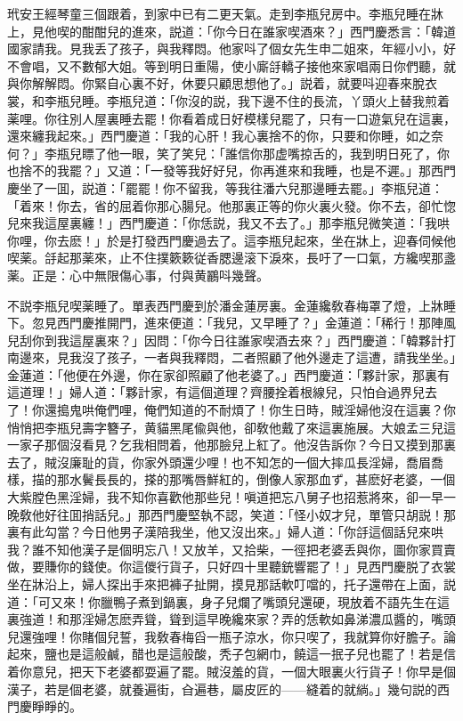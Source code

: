 玳安王經琴童三個跟着，到家中已有二更天氣。走到李瓶兒房中。李瓶兒睡在牀上，見他喫的酣酣兒的進來，説道：「你今日在誰家喫酒來？」西門慶悉言：「韓道國家請我。見我丢了孩子，與我釋悶。他家呌了個女先生申二姐來，年經小小，好不會唱，又不數郁大姐。等到明日重陽，使小廝㧱轎子接他來家唱兩日你們聽，就與你解解悶。你緊自心裏不好，休要只顧思想他了。」説着，就要呌迎春來脫衣裳，和李瓶兒睡。李瓶兒道：「你沒的説，我下邊不住的長流，丫頭火上替我煎着薬哩。你往別人屋裏睡去罷！你看着成日好模樣兒罷了，只有一口遊氣兒在這裏，還來纏我起來。」西門慶道：「我的心肝！我心裏捨不的你，只要和你睡，如之奈何？」李瓶兒瞟了他一眼，笑了笑兒：「誰信你那虚嘴掠舌的，我到明日死了，你也捨不的我罷？」又道：「一發等我好好兒，你再進來和我睡，也是不遲。」那西門慶坐了一囬，説道：「罷罷！你不留我，等我往潘六兒那邊睡去罷。」李瓶兒道：「着來！你去，省的屈着你那心腸兒。他那裏正等的你火裏火發。你不去，卻忙惚兒來我這屋裏纏！」西門慶道：「你恁説，我又不去了。」那李瓶兒微笑道：「我哄你哩，你去麽！」於是打發西門慶過去了。這李瓶兒起來，坐在牀上，迎春伺候他喫薬。㧱起那薬來，止不住撲簌簌従香腮邊滚下淚來，長吁了一口氣，方纔喫那盞薬。正是：心中無限傷心事，付與黄鸝呌幾聲。

不説李瓶兒喫薬睡了。單表西門慶到於潘金蓮房裏。金蓮纔敎春梅罩了燈，上牀睡下。忽見西門慶推開門，進來便道：「我兒，又早睡了？」金蓮道：「稀行！那陣風兒刮你到我這屋裏來？」因問：「你今日往誰家喫酒去來？」西門慶道：「韓夥計打南邊來，見我沒了孩子，一者與我釋悶，二者照顧了他外邊走了這遭，請我坐坐。」金蓮道：「他便在外邊，你在家卻照顧了他老婆了。」西門慶道：「夥計家，那裏有這道理！」婦人道：「夥計家，有這個道理？齊腰拴着根線兒，只怕㒲過界兒去了！你還搗鬼哄俺們哩，俺們知道的不耐煩了！你生日時，賊淫婦他沒在這裏？你悄悄把李瓶兒壽字簪子，黄貓黑尾偸與他，卻敎他戴了來這裏施展。大娘孟三兒這一家子那個沒看見？乞我相問着，他那臉兒上紅了。他沒告訴你？今日又摸到那裏去了，賊沒廉耻的貨，你家外頭還少哩！也不知怎的一個大摔瓜長淫婦，喬眉喬樣，描的那水鬢長長的，搽的那嘴唇鮮紅的，倒像人家那血ず，甚麽好老婆，一個大紫膛色黑淫婦，我不知你喜歡他那些兒！嗔道把忘八舅子也招惹將來，卻一早一晚敎他好往囬捎話兒。」那西門慶堅執不認，笑道：「怪小奴才兒，單管只胡説！那裏有此勾當？今日他男子漢陪我坐，他又沒出來。」婦人道：「你㧱這個話兒來哄我？誰不知他漢子是個明忘八！又放羊，又拾柴，一徑把老婆丢與你，圖你家買賣做，要賺你的錢使。你這儍行貨子，只好四十里聽銃響罷了！」見西門慶脱了衣裳坐在牀沿上，婦人探出手來把褲子扯開，摸見那話軟叮噹的，托子還帶在上面，説道：「可又來！你臘鴨子煮到鍋裏，身子兒爛了嘴頭兒還硬，現放着不語先生在這裏強道！和那淫婦怎麽弄聳，聳到這早晚纔來家？弄的恁軟如鼻涕濃瓜醬的，嘴頭兒還強哩！你賭個兒誓，我敎春梅舀一瓶子涼水，你只喫了，我就算你好膽子。論起來，鹽也是這般鹹，醋也是這般酸，秃子包網巾，饒這一抿子兒也罷了！若是信着你意兒，把天下老婆都耍遍了罷。賊沒羞的貨，一個大眼裏火行貨子！你早是個漢子，若是個老婆，就養遍街，㒲遍巷，屬皮匠的——縫着的就緔。」幾句説的西門慶睜睜的。

